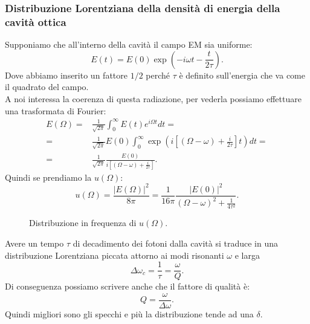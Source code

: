 \subsubsection{Distribuzione Lorentziana della densità di energia della cavità ottica}%
Supponiamo che all'interno della cavità il campo EM sia uniforme:
\[
    E(t) = E(0) \exp\left(-i\omega t- \frac{t}{2\tau}\right)
.\] 
Dove abbiamo inserito un fattore $1 /2$ perché $\tau$ è definito sull'energia che va come il quadrato del campo.\\
A noi interessa la coerenza di questa radiazione, per vederla possiamo effettuare una trasformata di Fourier:
\[\begin{aligned}
    E(\Omega) =& \frac{1}{\sqrt{2\pi} }\int_{0}^{\infty} E(t) e^{i\Omega t}dt=\\
    =&
    \frac{1}{\sqrt{2\pi}}E(0)\int_{0}^{\infty} 
    \exp\left(i\left[\left(\Omega -\omega\right)+ \frac{i}{2\tau}\right]t\right) dt=\\
    =&
    \frac{1}{\sqrt{2\pi}}
    \frac{E(0)}{i\left[\left(\Omega-\omega\right)+\frac{i}{2\tau}\right]}
.\end{aligned}\]
Quindi se prendiamo la $u(\Omega)$:
\[
    u(\Omega) = \frac{\left|E(\Omega)\right|^2}{8\pi} = \frac{1}{16\pi} 
    \frac{\left|E(0)\right|^2}{\left(\Omega-\omega\right)^2+ \frac{1}{4\tau^2}}
.\] 
\begin{figure}[H]
    \centering
    \caption{Distribuzione in frequenza di $u(\Omega)$.}
    \label{Lorentziana}
\end{figure}
\noindent
Avere un tempo $\tau$ di decadimento dei fotoni dalla cavità si traduce in una distribuzione Lorentziana piccata attorno ai modi risonanti $\omega$ e larga
\[
  \Delta\omega_c = \frac{1}{\tau}=\frac{\omega}{Q}  
.\] 
Di conseguenza possiamo scrivere anche che il fattore di qualità è:
\[
Q = \frac{\omega}{\Delta\omega}
.\] 
Quindi migliori sono gli specchi e più la distribuzione tende ad una $\delta$.

